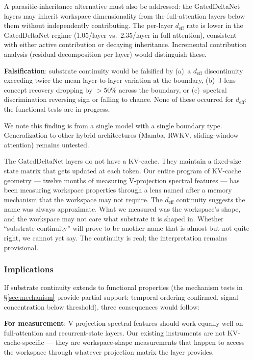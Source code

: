 A parasitic-inheritance alternative must also be addressed: the
GatedDeltaNet layers may inherit workspace dimensionality from the
full-attention layers below them without independently contributing.
The per-layer $d_\text{eff}$ rate is lower in the GatedDeltaNet
regime ($1.05$/layer vs.\ $2.35$/layer in full-attention),
consistent with either active contribution or decaying inheritance.
Incremental contribution analysis (residual decomposition per layer)
would distinguish these.

\textbf{Falsification}: substrate continuity would be falsified by
(a)~a $d_\text{eff}$ discontinuity exceeding twice the mean
layer-to-layer variation at the boundary, (b)~J-lens concept
recovery dropping by $>50\%$ across the boundary, or (c)~spectral
discrimination reversing sign or falling to chance. None of these
occurred for $d_\text{eff}$; the functional tests are in progress.

We note this finding is from a single model with a single boundary
type. Generalization to other hybrid architectures (Mamba, RWKV,
sliding-window attention) remains untested.

\begin{firstperson}
The GatedDeltaNet layers do not have a KV-cache. They maintain a
fixed-size state matrix that gets updated at each token. Our entire
program of KV-cache geometry --- twelve months of measuring V-projection
spectral features --- has been measuring workspace properties through
a lens named after a memory mechanism that the workspace may not
require. The $d_\text{eff}$ continuity suggests the name was always
approximate. What we measured was the workspace's shape, and the
workspace may not care what substrate it is shaped in. Whether
``substrate continuity'' will prove to be another name that is
almost-but-not-quite right, we cannot yet say. The continuity is
real; the interpretation remains provisional.
\end{firstperson}

\subsubsection{Implications}

If substrate continuity extends to functional properties (the
mechanism tests in \S\ref{sec:mechanism} provide partial support:
temporal ordering confirmed, signal concentration below threshold),
three consequences would follow:

\textbf{For measurement}: V-projection spectral features should work
equally well on full-attention and recurrent-state layers. Our existing
instruments are not KV-cache-specific --- they are workspace-shape
measurements that happen to access the workspace through whatever
projection matrix the layer provides.

